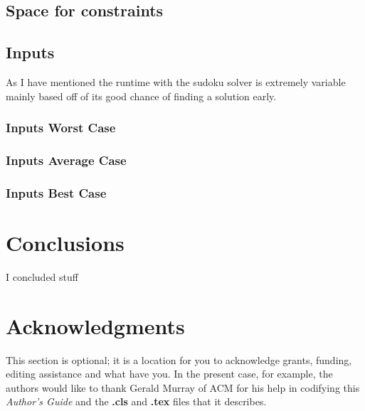 \documentclass{sig-alternate}
\begin{document}
\subsection{Space for constraints}

\subsection{Inputs} 

As I have mentioned the runtime with the sudoku solver is extremely variable mainly based off of its good chance of finding a solution early. 
\subsubsection{Inputs Worst Case}
\subsubsection{Inputs Average Case}
\subsubsection{Inputs Best Case}

 
\section{Conclusions}
I concluded stuff

\section{Acknowledgments}
This section is optional; it is a location for you
to acknowledge grants, funding, editing assistance and
what have you.  In the present case, for example, the
authors would like to thank Gerald Murray of ACM for
his help in codifying this \textit{Author's Guide}
and the \textbf{.cls} and \textbf{.tex} files that it describes.

%
\cite{*}

%
%
\end{document}
